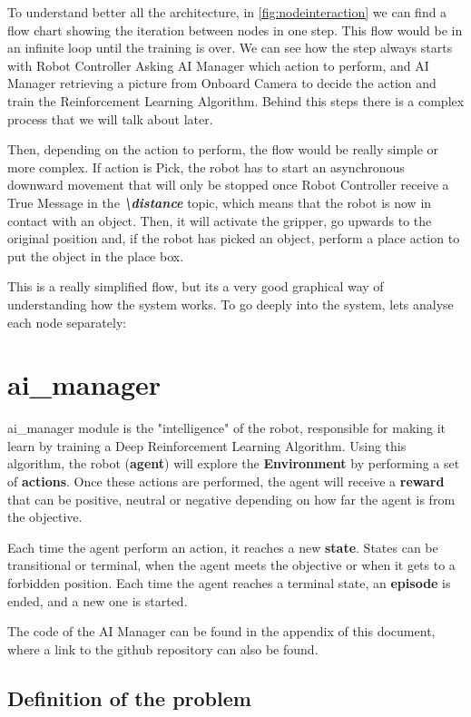 		To understand better all the architecture, in \autoref{fig:nodeinteraction} we can find a flow chart showing the iteration between nodes in one step. This flow would be in an infinite loop until the training is over. We can see how the step always starts with Robot Controller Asking AI Manager which action to perform, and AI Manager retrieving a picture from Onboard Camera to decide the action and train the Reinforcement Learning Algorithm. Behind this steps there is a complex process that we will talk about later.
		
		Then, depending on the action to perform, the flow would be really simple or more complex. If action is Pick, the robot has to start an asynchronous downward movement that will only be stopped once Robot Controller receive a True Message in the \textbf{\textit{\textbackslash distance }} topic, which means that the robot is now in contact with an object. Then, it will activate the gripper, go upwards to the original position and, if the robot has picked an object, perform a place action to put the object in the place box.
		
		This is a really simplified flow, but its a very good graphical way of understanding how the system works. To go deeply into the system, lets analyse each node separately:
		
		
	\section{ai\_manager}
	
			ai\_manager module is the "intelligence" of the robot, responsible for making it learn by training a Deep Reinforcement Learning Algorithm. Using this algorithm, the robot (\textbf{agent}) will explore the \textbf{Environment} by performing a set of \textbf{actions}. Once these actions are performed, the agent will receive a \textbf{reward} that can be positive, neutral or negative depending on how far the agent is from the objective.
			
			Each time the agent perform an action, it reaches a new \textbf{state}. States can be transitional or terminal, when the agent meets the objective or when it gets to a forbidden position. Each time the agent reaches a terminal state, an \textbf{episode} is ended, and a new one is started.
			
			The code of the AI Manager can be found in the appendix of this document, where a link to the github repository can also be found.
			
		\subsection{Definition of the problem}
			
